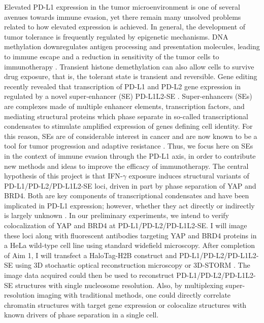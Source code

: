 Elevated PD-L1 expression in the tumor microenvironment is one of several avenues towards immune evasion, yet there remain many unsolved problems related to how elevated expression is achieved.  In general, the development of tumor tolerance is frequently regulated by epigenetic mechanisms. DNA methylation downregulates antigen processing and presentation molecules, leading to immune escape and a reduction in sensitivity of the tumor cells to immunotherapy \parencite{Li2021}. Transient histone demethylation can also allow cells to survive drug exposure, that is, the tolerant state is transient and reversible. Gene editing recently revealed that transcription of PD-L1 and PD-L2 gene expression in regulated by a novel super-enhancer (SE) PD-L1L2-SE \parencite{Xu2019}. Super-enhancers (SEs) are complexes made of multiple enhancer elements, transcription factors, and mediating structural proteins which phase separate in so-called transcriptional condensates to stimulate amplified expression of genes defining cell identity. For this reason, SEs are of considerable interest in cancer and are now known to be a tool for tumor progression and adaptive resistance \parencite{Xu2019}. Thus, we focus here on SEs in the context of immune evasion through the PD-L1 axis, in order to contribute new methods and ideas to improve the efficacy of immunotherapy.  The central hypothesis of this project is that IFN-$\gamma$ exposure induces structural variants of PD-L1/PD-L2/PD-L1L2-SE loci, driven in part by phase separation of YAP and BRD4. Both are key components of transcriptional condensates and have been implicated in PD-L1 expression; however, whether they act directly or indirectly is largely unknown \parencite{Xu2019,Yu2021}. In our preliminary experiments, we intend to verify colocalization of YAP and BRD4 at PD-L1/PD-L2/PD-L1L2-SE. I will image these loci along with fluorescent antibodies targeting YAP and BRD4 proteins in a HeLa wild-type cell line using standard widefield microscopy. After completion of Aim 1, I will transfect a HaloTag-H2B construct and PD-L1/PD-L2/PD-L1L2-SE using 3D stochastic optical reconstruction microscopy or 3D-STORM \parencite{Huang2008}. The image data acquired could then be used to reconstruct PD-L1/PD-L2/PD-L1L2-SE structures with single nucleosome resolution. Also, by multiplexing super-resolution imaging with traditional methods, one could directly correlate chromatin structures with target gene expression or colocalize structures with known drivers of phase separation in a single cell.


